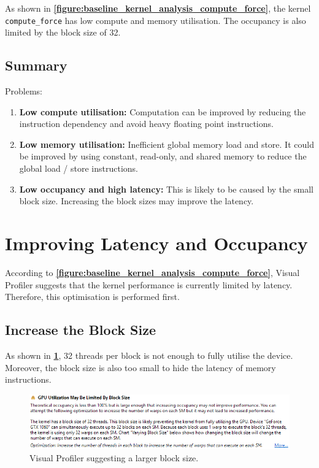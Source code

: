 \documentclass[12pt, a4paper]{article}
\let\oldcref\cref
\renewcommand{\cref}[1]{\textbf{\oldcref{#1}}}
\begin{document}
As shown in \cref{figure:baseline_kernel_analysis_compute_force}, the kernel \texttt{compute\_force}
has low compute and memory utilisation. The occupancy is also limited by the block size of 32.

\subsection{Summary}
\noindent Problems:
\begin{enumerate}
  \item \textbf{Low compute utilisation:} Computation can be improved by reducing the instruction
  dependency and avoid heavy floating point instructions.
  \item \textbf{Low memory utilisation:} Inefficient global memory load and store. It could be
  improved by using constant, read-only, and shared memory to reduce the global load / store
  instructions.
  \item \textbf{Low occupancy and high latency:} This is likely to be caused by the small block
  size. Increasing the block sizes may improve the latency.
\end{enumerate}

\section{Improving Latency and Occupancy}
According to \cref{figure:baseline_kernel_analysis_compute_force}, Visual Profiler suggests that the
kernel performance is currently limited by latency. Therefore, this optimisation is performed first.

\subsection{Increase the Block Size}
As shown in \cref{figure:latency_analysis_32_threads_per_block}, 32 threads per block is not enough
to fully utilise the device. Moreover, the block  size is also too small to hide the latency of
memory instructions.
\begin{figure}[ht]
  \centering
  \includegraphics[width=\textwidth]{images/latency_analysis_32_threads_per_block.png}
  \caption{Visual Profiler suggesting a larger block size.}
  \label{figure:latency_analysis_32_threads_per_block}
\end{figure}
\end{document}
